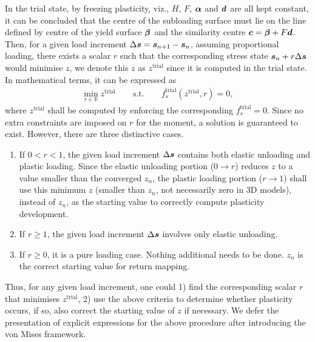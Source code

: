 In the trial state, by freezing plasticity, viz., $H$, $F$, $\bm{\alpha}$ and $\bm{d}$ are all kept constant, it can be concluded that the centre of the subloading surface must lie on the line defined by centre of the yield surface $\bm{\beta}$ and the similarity centre $\bm{c}=\bm{\beta}+F\bm{d}$.
Then, for a given load increment $\Delta\bm{s}=\bm{s}_{n+1}-\bm{s}_n$, assuming proportional loading, there exists a scalar $r$ such that the corresponding stress state $\bm{s}_n+r\Delta\bm{s}$ would minimise $z$, we denote this $z$ as $z^\text{trial}$ since it is computed in the trial state.
In mathematical terms, it can be expressed as
\begin{gather}
    \boxed{\min\limits_{r\in\mathbb{R}}z^\text{trial}\qquad\text{s.t.}\qquad{}f_s^\text{trial}\left(z^\text{trial},r\right)=0,}
\end{gather}
where $z^\text{trial}$ shall be computed by enforcing the corresponding $f_s^\text{trial}=0$.
Since no extra constraints are imposed on $r$ for the moment, a solution is guaranteed to exist.
However, there are three distinctive cases.
\begin{enumerate}
    \item If $0<r<1$, the given load increment $\Delta\bm{s}$ contains both elastic unloading and plastic loading.
          Since the elastic unloading portion ($0\to{}r$) reduces $z$ to a value smaller than the converged $z_n$, the plastic loading portion ($r\to{}1$) shall use this minimum $z$ (smaller than $z_n$, not necessarily zero in 3D models), instead of $z_n$, as the starting value to correctly compute plasticity development.
    \item If $r\geqslant1$, the given load increment $\Delta\bm{s}$ involves only elastic unloading.
    \item If $r\geqslant0$, it is a pure loading case. Nothing additional needs to be done. $z_n$ is the correct starting value for return mapping.
\end{enumerate}
Thus, for any given load increment, one could 1) find the corresponding scalar $r$ that minimises $z^\text{trial}$, 2) use the above criteria to determine whether plasticity occurs, if so, also correct the starting value of $z$ if necessary.
We defer the presentation of explicit expressions for the above procedure after introducing the von Mises framework.
